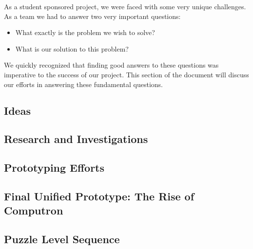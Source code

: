 As a student sponsored project, we were faced with some very unique
challenges. As a team we had to answer two very important questions:
\begin{itemize}
	\item What exactly is the problem we wish to solve?
	\item What is our solution to this problem?
\end{itemize}

We quickly recognized that finding good answers to these questions was imperative 
to the success of our project. This section of the document will discuss our efforts in 
answering these fundamental questions.\\

\subsection{Ideas}
	

\subsection{Research and Investigations}
	

\subsection{Prototyping Efforts}
	
\newpage

\subsection{Final Unified Prototype: The Rise of Computron}
	
\newpage

\subsection{Puzzle Level Sequence}
\label{section:tutorial}
	